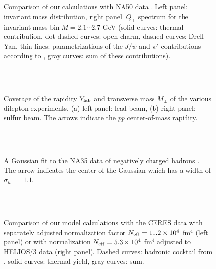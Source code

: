 \begin{figure}[t] %
\centering
~\\[-.1cm]
\hfill
{}
~\\[.5cm]
\caption{
Comparison of our calculations with NA50 data \cite{NA50}.
Left panel: invariant mass distribution,
right panel: $Q_\perp$ spectrum for the invariant
mass bin $M = 2.1 \cdots 2.7$ GeV
(solid curves: thermal contribution,
dot-dashed curves: open charm,
dashed curves: Drell-Yan,
thin lines: parametrizations of the $J/\psi$ and $\psi'$
contributions according to \cite{NA50},
gray curves: sum of these contributions).
}
\label{f_2}
\end{figure}

\begin{figure}[t] %
\centering
~\\[-.1cm]
\hfill
{}
~\\[.5cm]
\caption{
Coverage of the rapidity $Y_{\rm lab}$ and transverse mass $M_\perp$ of the
various dilepton experiments.
(a) left panel: lead beam,
(b) right panel: sulfur beam.
The arrows indicate the $pp$ center-of-mass rapidity. 
}
\label{f_3}
\end{figure}

\begin{figure}[t] %
\centering
~\\[-.1cm]
~\\[.5cm]
\caption{
A Gaussian fit to the NA35 data of negatively charged hadrons
\cite{NA35}. 
The arrow indicates
the center of the Gaussian which has a width of $\sigma_{h^-} = 1.1$. 
}
\label{f_15}
\end{figure}

\begin{figure}[t] %
\centering
~\\[-.1cm]
\hfill
{}
~\\[.5cm]
\caption{
Comparison of our model calculations with the CERES data
\cite{CERES_S} with separately adjusted normalization factor
$N_{\rm eff} = 11.2 \times 10^4$ fm${}^4$
(left panel) or with normalization 
$N_{\rm eff} = 5.3 \times 10^4 $ fm${}^4$
adjusted to HELIOS/3 data \cite{HELIOS-3} (right panel). 
Dashed curves: hadronic cocktail from \cite{CERES_S},
solid curves: thermal yield,
gray curves: sum.
}
\label{f_5}
\end{figure}

